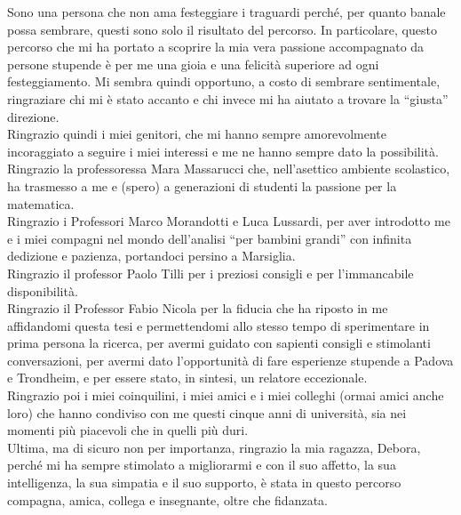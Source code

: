 \documentclass[corpo=11pt, stile=classica, tipotesi=custom,
greek, evenboxes, english, twoside, cucitura]{toptesi} %
\newcommand\myemptypage{
	\null
	\thispagestyle{empty}
	\addtocounter{page}{-1}
	\newpage
}
\numberwithin{equation}{chapter}
\theoremstyle{definition}
\theoremstyle{remark}
\begin{document}
	


\myemptypage

\setcounter{page}{1}
\ringraziamenti

Sono una persona che non ama festeggiare i traguardi perché, per quanto banale possa sembrare, questi sono solo il risultato del percorso. In particolare, questo percorso che mi ha portato a scoprire la mia vera passione accompagnato da persone stupende è per me una gioia e una felicità superiore ad ogni festeggiamento.
Mi sembra quindi opportuno, a costo di sembrare sentimentale, ringraziare chi mi è stato accanto e chi invece mi ha aiutato a trovare la ``giusta'' direzione.\\
Ringrazio quindi i miei genitori, che mi hanno sempre amorevolmente incoraggiato a seguire i miei interessi e me ne hanno sempre dato la possibilità.\\
Ringrazio la professoressa Mara Massarucci che, nell'asettico ambiente scolastico, ha trasmesso a me e (spero) a generazioni di studenti la passione per la matematica.\\
Ringrazio i Professori Marco Morandotti e Luca Lussardi, per aver introdotto me e i miei compagni nel mondo dell'analisi ``per bambini grandi'' con infinita dedizione e pazienza, portandoci persino a Marsiglia.\\
Ringrazio il professor Paolo Tilli  per i preziosi consigli e per l'immancabile disponibilità.\\
Ringrazio il Professor Fabio Nicola per la fiducia che ha riposto in me affidandomi questa tesi e permettendomi allo stesso tempo di sperimentare in prima persona la ricerca, per avermi guidato con sapienti consigli e stimolanti conversazioni, per avermi dato l'opportunità di fare esperienze stupende a Padova e Trondheim, e per essere stato, in sintesi, un relatore eccezionale.\\
Ringrazio poi i miei coinquilini, i miei amici e i miei colleghi (ormai amici anche loro) che hanno condiviso con me questi cinque anni di università, sia nei momenti più piacevoli che in quelli più duri.\\
Ultima, ma di sicuro non per importanza, ringrazio la mia ragazza, Debora, perché mi ha sempre stimolato a migliorarmi e con il suo affetto, la sua intelligenza, la sua simpatia e il suo supporto, è stata in questo percorso compagna, amica, collega e insegnante, oltre che fidanzata.
\end{document}
